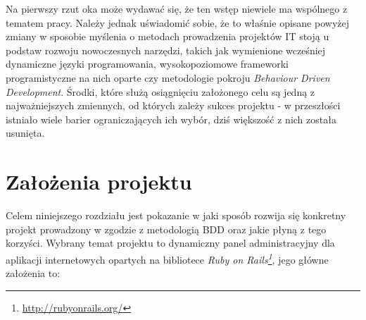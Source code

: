   Na pierwszy rzut oka może wydawać się, że ten wstęp niewiele ma wspólnego z tematem pracy. Należy jednak uświadomić sobie, że to właśnie opisane powyżej zmiany w sposobie myślenia o metodach prowadzenia projektów IT stoją u podstaw rozwoju nowoczesnych narzędzi, takich jak wymienione wcześniej dynamiczne języki programowania, wysokopoziomowe frameworki programistyczne na nich oparte czy metodologie pokroju \emph{Behaviour Driven Development}. Środki, które służą osiągnięciu założonego celu są jedną z najważniejszych zmiennych, od których zależy sukces projektu - w przeszłości istniało wiele barier ograniczających ich wybór, dziś większość z nich została usunięta.
  
  \section{Założenia projektu}
  Celem niniejszego rozdziału jest pokazanie w jaki sposób rozwija się konkretny projekt prowadzony w zgodzie z metodologią BDD oraz jakie płyną z tego korzyści. Wybrany temat projektu to dynamiczny panel administracyjny dla aplikacji internetowych opartych na bibliotece \emph{Ruby on Rails\footnote{\url{http://rubyonrails.org/}}}, jego główne założenia to:
  
